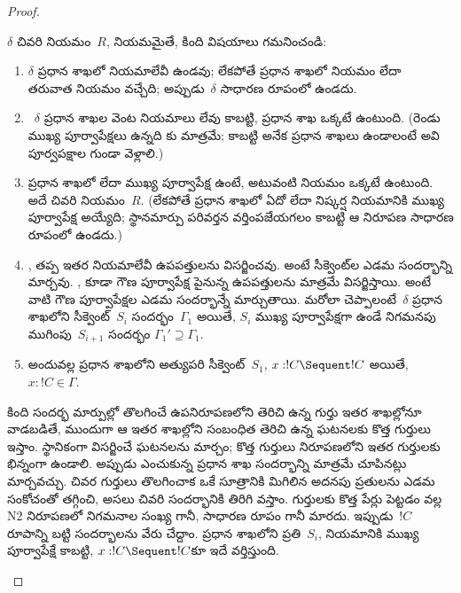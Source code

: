 \documentclass[../../../include/open-logic-section]{subfiles}
\begin{document}
\begin{proof}
\begin{enumerate}
  $\delta$ చివరి నియమం~$R$,  నియమమైతే, కింది విషయాలు గమనించండి:
  \begin{enumerate}
    \item $\delta$ ప్రధాన శాఖలో  నియమాలేవీ ఉండవు; లేకపోతే ప్రధాన శాఖలో  నియమం లేదా~\FalseInt{} తరువాత  నియమం వచ్చేది; అప్పుడు~$\delta$ సాధారణ రూపంలో ఉండదు.
    \item ~$\delta$ ప్రధాన శాఖల వెంట  నియమాలు లేవు కాబట్టి, ప్రధాన శాఖ ఒక్కటే ఉంటుంది. (రెండు ముఖ్య పూర్వాపేక్షలు ఉన్నది \Intro{\land}కు మాత్రమే; కాబట్టి అనేక ప్రధాన శాఖలు ఉండాలంటే అవి \Intro{\land} పూర్వపక్షాల గుండా వెళ్లాలి.)
    \item ప్రధాన శాఖలో \Elim{\lor} లేదా \Elim{\lexists} ముఖ్య పూర్వాపేక్ష ఉంటే, అటువంటి నియమం ఒక్కటే ఉంటుంది. అదే చివరి నియమం~$R$. (లేకపోతే ప్రధాన శాఖలో ఏదో \Elim{\lor} లేదా \Elim{\lexists} నిష్కర్ష  నియమానికి ముఖ్య పూర్వాపేక్ష అయ్యేది; స్థానమార్పు పరివర్తన వర్తింపజేయగలం కాబట్టి ఆ నిరూపణ సాధారణ రూపంలో ఉండదు.)
  \item \Elim{\lor}, \Elim{\lexists} తప్ప ఇతర  నియమాలేవీ ఉపపత్తులను విసర్జించవు. అంటే సీక్వెంట్‌ల ఎడమ సందర్భాన్ని మార్చవు. \Elim{\lor}, \Elim{\lexists} కూడా గౌణ పూర్వాపేక్ష పైనున్న ఉపపత్తులను మాత్రమే విసర్జిస్తాయి. అంటే వాటి గౌణ పూర్వాపేక్షల ఎడమ సందర్భాన్నే మార్చుతాయి. మరోలా చెప్పాలంటే~$\delta$ ప్రధాన శాఖలోని సీక్వెంట్~$S_i$ సందర్భం~$\Gamma_1$ అయితే, $S_i$ ముఖ్య పూర్వాపేక్షగా ఉండే నిగమనపు ముగింపు~$S_{i+1}$ సందర్భం $\Gamma_1' \supseteq \Gamma_1$.
  \item అందువల్ల ప్రధాన శాఖలోని అత్యుపరి సీక్వెంట్~$S_1$, $x: !C \Sequent !C$ అయితే, $x:!C \in \Gamma$.
  \end{enumerate}
  కింది సందర్భ మార్పుల్లో తొలగించే ఉపనిరూపణలోని తెరిచి ఉన్న గుర్తు ఇతర శాఖల్లోనూ వాడబడితే, ముందుగా ఆ ఇతర శాఖల్లోని సంబంధిత తెరిచి ఉన్న ఘటనలకు కొత్త గుర్తులు ఇస్తాం. స్థానికంగా విసర్జించే ఘటనలను మార్చం; కొత్త గుర్తులు నిరూపణలోని ఇతర గుర్తులకు భిన్నంగా ఉండాలి. అప్పుడు ఎంచుకున్న ప్రధాన శాఖ సందర్భాన్ని మాత్రమే చూపినట్లు మార్చవచ్చు. చివర గుర్తులు తొలగించాక ఒకే సూత్రానికి మిగిలిన అదనపు ప్రతులను ఎడమ సంకోచంతో తగ్గించి, అసలు చివరి సందర్భానికి తిరిగి వస్తాం. గుర్తులకు కొత్త పేర్లు పెట్టడం వల్ల N2 నిరూపణలో నిగమనాల సంఖ్య గానీ, సాధారణ రూపం గానీ మారదు.
  ఇప్పుడు~$!C$ రూపాన్ని బట్టి సందర్భాలను వేరు చేద్దాం. ప్రధాన శాఖలోని ప్రతి~$S_i$,  నియమానికి ముఖ్య పూర్వాపేక్షే కాబట్టి, $x:!C \Sequent !C$కూ ఇదే వర్తిస్తుంది.


\end{enumerate}
\end{proof}
\end{document}
